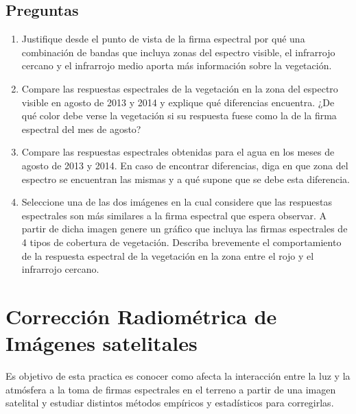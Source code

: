 \documentclass[hidelinks,12pt]{article}
\begin{document}
\subsection{Preguntas}
\begin{enumerate}
    \item Justifique desde el punto de vista de la firma espectral por qué una
        combinación de bandas que incluya zonas del espectro visible, el
        infrarrojo cercano y el infrarrojo medio aporta más información sobre la
        vegetación.
    \item Compare las respuestas espectrales de la vegetación en la zona del
        espectro visible en agosto de 2013 y 2014 y explique qué diferencias
        encuentra. ¿De qué color debe verse la vegetación si su respuesta fuese
        como la de la firma espectral del mes de agosto?
    \item Compare las respuestas espectrales obtenidas para el agua en los meses
        de agosto de 2013 y 2014. En caso de encontrar diferencias, diga en que zona
        del espectro se encuentran las mismas y a qué supone que se debe esta
        diferencia.
    \item Seleccione una de las dos imágenes en la cual considere que las
        respuestas espectrales son más similares a la firma espectral que espera
        observar. A partir de dicha imagen genere un gráfico que incluya las
        firmas espectrales de 4 tipos de cobertura de vegetación. Describa
        brevemente el comportamiento de la respuesta espectral de la vegetación
        en la zona entre el rojo y el infrarrojo cercano.
\end{enumerate}

\newpage
\section{Corrección Radiométrica de Imágenes satelitales}
Es objetivo de esta practica es conocer como afecta la interacción entre la luz
y la atmósfera a la toma de firmas espectrales en el terreno a partir de una
imagen satelital y estudiar distintos métodos empíricos y estadísticos para
corregirlas.
\end{document}
